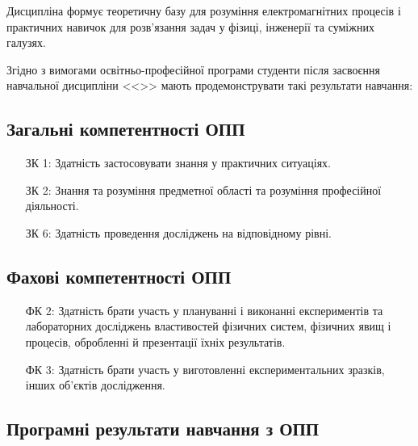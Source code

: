 \documentclass{Syllabus}
\begin{document}
 Дисципліна формує теоретичну базу для розуміння електромагнітних процесів і практичних навичок для розв’язання задач у фізиці, інженерії та суміжних галузях.

Згідно з вимогами освітньо-професійної програми
студенти після засвоєння навчальної дисципліни <<\discipline>> мають продемонструвати такі результати навчання:

\subsection*{Загальні компетентності ОПП}

\begin{enumerate}
    \item [ЗК 1:] Здатність застосовувати знання у практичних ситуаціях.
	\item [ЗК 2:] Знання та розуміння предметної області та розуміння професійної діяльності.
    \item [ЗК 6:] Здатність проведення досліджень на відповідному рівні.
\end{enumerate}

\subsection*{Фахові компетентності ОПП}

\begin{enumerate}
	\item [ФК 2:] Здатність брати участь у плануванні і виконанні експериментів та лабораторних досліджень властивостей фізичних систем, фізичних явищ і процесів, обробленні й презентації їхніх результатів.
    \item [ФК 3:] Здатність брати участь у виготовленні експериментальних зразків, інших об'єктів дослідження.
\end{enumerate}

\subsection*{Програмні результати навчання з ОПП}
\end{document}
